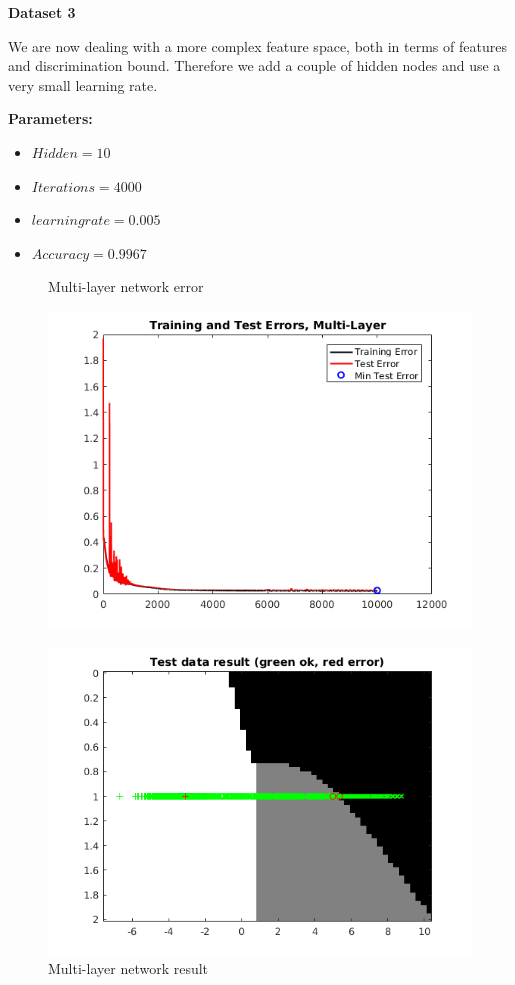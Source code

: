 \documentclass[a4paper,12pt]{article}
\begin{document}
\noindent \textbf{Dataset 3}

We are now dealing with a more complex feature space, both in terms of features and discrimination bound. Therefore we add a couple of hidden nodes and use a very small learning rate.

\textbf{Parameters:}
\begin{itemize}
\item $Hidden = 10$
\item $Iterations = 4000$
\item $learning rate = 0.005$
\item $Accuracy = 0.9967$
\end{itemize}

\begin{figure}[H]
\centering
  \begin{minipage}[]{0.49\textwidth}
  \caption{Multi-layer network error}\label{fig:multi_3_error}
  \includegraphics[width=\textwidth]{figures/multi_3_error.png}
  \end{minipage}
  \begin{minipage}[]{0.49\textwidth}
  \caption{Multi-layer network result}\label{fig:multi_3_test}
  \includegraphics[width=\textwidth]{figures/multi_3_test.png}
  \end{minipage}
\end{figure}
\end{document}
